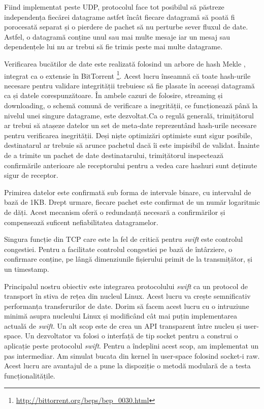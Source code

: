 Fiind implementat peste UDP, protocolul face tot posibilul să păstreze
independența fiecărei datagrame astfet încât fiecare datagramă să poată fi
porocesată separat și o pierdere de pachet să nu perturbe sever fluxul de
date. Astfel, o datagramă conține unul sau mai multe mesaje iar un mesaj
sau dependențele lui nu ar trebui să fie trimis peste mai multe datagrame.

Verificarea bucătilor de date este realizată folosind un arbore de hash
Mekle \cite{merkle}, integrat ca o extensie în BitTorrent
\footnote{\url{http://bittorrent.org/beps/bep\_0030.html}}. Acest lucru
înseamnă că toate hash-urile necesare pentru validare integrității
trebuiesc să fie plasate în aceeași datagramă ca și datele corespunzătoare.
În ambele cazuri de folosire, streaming și downloading, o schemă comună de
verificare a inegrității, ce funcționează până la nivelul unei singure
datagrame, este dezvoltat.Ca o regulă generală, trimițătorul ar trebui să
atașeze datelor un set de meta-date reprezentând hash-urile necesare pentru
verificarea inegrității. Deși niște optimizări optimiste sunt sigur
posibile, destinatarul ar trebuie să arunce pachetul dacă îi este impisibil
de validat. Înainte de a trimite un pachet de date destinatarului,
trimițătorul inspectează confirmările anterioare ale receptorului pentru a
vedea care hashuri sunt deținute sigur de receptor.

Primirea datelor este confirmată sub forma de intervale binare, cu
intervalul de bază de 1KB. Drept urmare, fiecare pachet este confirmat de
un număr logaritmic de dăți. Acest mecanism oferă o redundanță necesară a
confirmărilor și compensează suficent nefiabilitatea datagramelor.

Singura funcție din TCP care este la fel de critică pentru \textit{swift}
este controlul congestiei. Pentru a facilitate controlul congestiei pe bază
de întârziere, o confirmare conține, pe lângă dimenziunile fișierului primit
de la transmițător, și un timestamp.

Principalul nostru obiectiv este integrarea protocolului \textit{swift} ca
un protocol de transport în stiva de rețea din nucleul Linux. Acest lucru
va crește semnificativ performanța transferurilor de date. Dorim să facem
acest lucru cu o intruziune minimă asupra nucleului Linux și modificând cât
mai puțin implementarea actuală de \textit{swift}. Un alt scop este de crea
un API transparent între nucleu și user-space. Un dezvoltator va folosi o
interfață de tip socket pentru a construi o aplicație peste protocolul
\textit{swift}. Pentru a îndeplini acest scop, am implementat un pas
intermediar. Am simulat bucata din kernel în user-space folosind socket-i
raw. Acest lucru are avantajul de a pune la dispoziție o metodă modulară de
a testa funcționalitățile.

